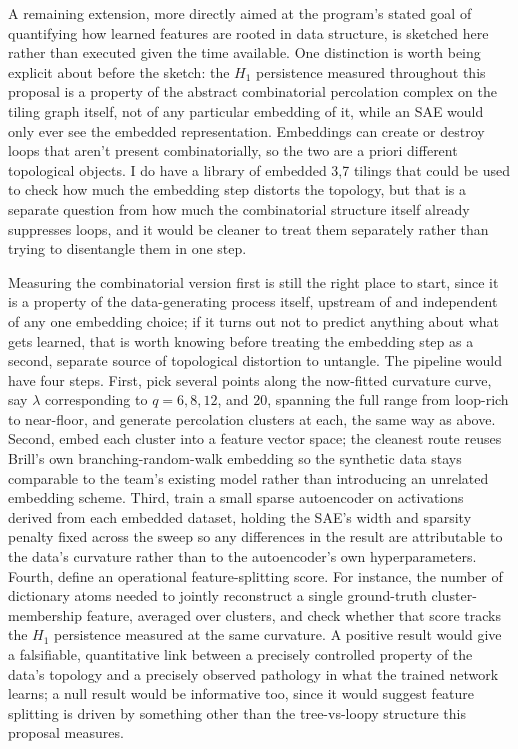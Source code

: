 \documentclass[11pt]{article}
\begin{document}
A remaining extension, more directly aimed at the program's stated goal of quantifying how learned features are rooted in data structure, is sketched here rather than executed given the time available. One distinction is worth being explicit about before the sketch: the $H_1$ persistence measured throughout this proposal is a property of the abstract combinatorial percolation complex on the tiling graph itself, not of any particular embedding of it, while an SAE would only ever see the embedded representation. Embeddings can create or destroy loops that aren't present combinatorially, so the two are a priori different topological objects. I do have a library of embedded {3,7} tilings that could be used to check how much the embedding step distorts the topology, but that is a separate question from how much the combinatorial structure itself already suppresses loops, and it would be cleaner to treat them separately rather than trying to disentangle them in one step.

Measuring the combinatorial version first is still the right place to start, since it is a property of the data-generating process itself, upstream of and independent of any one embedding choice; if it turns out not to predict anything about what gets learned, that is worth knowing before treating the embedding step as a second, separate source of topological distortion to untangle. The pipeline would have four steps. First, pick several points along the now-fitted curvature curve, say $\lambda$ corresponding to $q = 6, 8, 12$, and $20$, spanning the full range from loop-rich to near-floor, and generate percolation clusters at each, the same way as above. Second, embed each cluster into a feature vector space; the cleanest route reuses Brill's own branching-random-walk embedding so the synthetic data stays comparable to the team's existing model rather than introducing an unrelated embedding scheme. Third, train a small sparse autoencoder on activations derived from each embedded dataset, holding the SAE's width and sparsity penalty fixed across the sweep so any differences in the result are attributable to the data's curvature rather than to the autoencoder's own hyperparameters. Fourth, define an operational feature-splitting score. For instance, the number of dictionary atoms needed to jointly reconstruct a single ground-truth cluster-membership feature, averaged over clusters, and check whether that score tracks the $H_1$ persistence measured at the same curvature. A positive result would give a falsifiable, quantitative link between a precisely controlled property of the data's topology and a precisely observed pathology in what the trained network learns; a null result would be informative too, since it would suggest feature splitting is driven by something other than the tree-vs-loopy structure this proposal measures.
\end{document}
